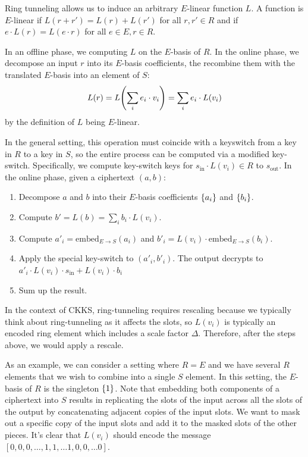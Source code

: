 \documentclass[../fheimpl.tex]{subfiles}
\begin{document}
	Ring tunneling allows us to induce an arbitrary $E$-linear function $L$. A function is $E$-linear if $L(r+r') = L(r) + L(r')$ for all $r, r'\in R$ and if $e\cdot L(r) = L(e\cdot r)$ for all $e\in E, r\in R$.
	
	In an offline phase, we computing $L$ on the $E$-basis of $R$. In the online phase, we decompose an input $r$ into its $E$-basis coefficients, the recombine them with the translated $E$-basis into an element of $S$:
	\[L(r) = L\parens*{\sum_i e_i \cdot v_i} = \sum_i e_i\cdot L(v_i)\]
	by the definition of $L$ being $E$-linear.
	
	In the general setting, this operation must coincide with a keyswitch from a key in $R$ to a key in $S$, so the entire process can be computed via a modified key-switch. Specifically, we compute key-switch keys for $s_\mathrm{in}\cdot L(v_i)\in R$ to $s_\mathrm{out}$. In the online phase, given a ciphertext $(a, b)$:
	\begin{enumerate}
		\item Decompose $a$ and $b$ into their $E$-basis coefficients $\{a_i\}$ and $\{b_i\}$.
		\item Compute $b' = L(b) = \sum_i b_i\cdot L(v_i)$.
		\item Compute $a'_i = \mathrm{embed}_{E\rightarrow S}(a_i)$ and $b'_i = L(v_i)\cdot \mathrm{embed}_{E\rightarrow S}(b_i)$.
		\item Apply the special key-switch to $(a'_i, b'_i)$. The output decrypts to $a'_i\cdot L(v_i)\cdot s_\mathrm{in} + L(v_i)\cdot b_i$
		\item Sum up the result.
	\end{enumerate}
	
	In the context of CKKS, ring-tunneling requires rescaling because we typically think about ring-tunneling as it affects the slots, so $L(v_i)$ is typically an encoded ring element which includes a scale factor $\Delta$. Therefore, after the steps above, we would apply a rescale.
	
	As an example, we can consider a setting where $R=E$ and we have several $R$ elements that we wish to combine into a single $S$ element. In this setting, the $E$-basis of $R$ is the singleton $\{1\}$. Note that embedding both components of a ciphertext into $S$ results in replicating the slots of the input across all the slots of the output by concatenating adjacent copies of the input slots. We want to mask out a specific copy of the input slots and add it to the masked slots of the other pieces. It's clear that $L(v_i)$ should encode the message $[0, 0, 0, \ldots, 1, 1, \ldots 1, 0, 0, \ldots 0]$.
	
\end{document}

